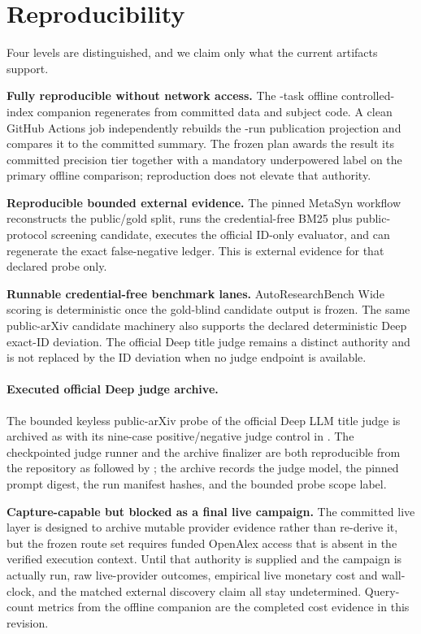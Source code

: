 \section{Reproducibility}
\label{sec:reproducibility}

Four levels are distinguished, and we claim only what the current artifacts
support.

\textbf{Fully reproducible without network access.}  The \OfflineTaskCount{}-task offline
controlled-index companion regenerates from committed data and subject code.  A
clean GitHub Actions job independently rebuilds the \OfflineRunRecordCount{}-run publication
projection and compares it to the committed summary.  The frozen plan awards
the result its committed precision tier together with a
mandatory underpowered label on the primary offline comparison; reproduction
does not elevate that authority.

\textbf{Reproducible bounded external evidence.}  The pinned MetaSyn workflow
reconstructs the public/gold split, runs the credential-free BM25 plus
public-protocol screening candidate, executes the official ID-only evaluator,
and can regenerate the exact false-negative ledger.  This is external evidence
for that declared probe only.

\textbf{Runnable credential-free benchmark lanes.}  AutoResearchBench Wide
scoring is deterministic once the gold-blind candidate output is frozen.  The
same public-arXiv candidate machinery also supports the declared deterministic
Deep exact-ID deviation.  The official Deep title judge remains a distinct
authority and is not replaced by the ID deviation when no judge endpoint is
available.

\paragraph{Executed official Deep judge archive.}  The bounded keyless public-arXiv probe of the official Deep LLM title judge is archived as  with its nine-case positive/negative judge control in .  The checkpointed judge runner and the archive finalizer are both reproducible from the repository as  followed by ; the archive records the judge model, the pinned prompt digest, the run manifest hashes, and the bounded probe scope label.

\textbf{Capture-capable but blocked as a final live campaign.}  The committed
live layer is designed to archive mutable provider evidence rather than
re-derive it, but the frozen route set requires funded OpenAlex access that is
absent in the verified execution context.  Until that authority is supplied and
the campaign is actually run, raw live-provider outcomes,
empirical live monetary cost and wall-clock, and the matched external discovery
claim all stay undetermined.  Query-count metrics from the offline companion
are the completed cost evidence in this revision.

